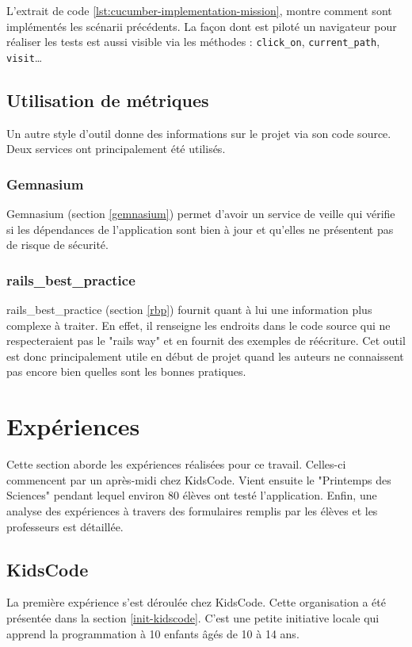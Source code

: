 L'extrait de code \ref{lst:cucumber-implementation-mission}, montre comment sont implémentés les scénarii précédents. La façon dont est piloté un navigateur pour réaliser les tests est aussi visible via les méthodes : \texttt{click\_on}, \texttt{current\_path}, \texttt{visit}\ldots

\subsection{Utilisation de métriques}
Un autre style d'outil donne des informations sur le projet via son code source. Deux services ont principalement été utilisés.

\subsubsection{Gemnasium}
Gemnasium (section \ref{gemnasium}) permet d'avoir un service de veille qui vérifie si les dépendances de l'application sont bien à jour et qu'elles ne présentent pas de risque de sécurité.

\subsubsection{rails\_best\_practice}
rails\_best\_practice (section \ref{rbp}) fournit quant à lui une information plus complexe à traiter. En effet, il renseigne les endroits dans le code source qui ne respecteraient pas le "rails way" et en fournit des exemples de réécriture. Cet outil est donc principalement utile en début de projet quand les auteurs ne connaissent pas encore bien quelles sont les bonnes pratiques.

\section{Expériences}
\label{experience}
Cette section aborde les expériences réalisées pour ce travail. Celles-ci commencent par un après-midi chez KidsCode. Vient ensuite le "Printemps des Sciences" pendant lequel environ 80 élèves ont testé l'application. Enfin, une analyse des expériences à travers des formulaires remplis par les élèves et les professeurs est détaillée.

\subsection{KidsCode}
\label{kidscode}
La première expérience s'est déroulée chez KidsCode. Cette organisation a été présentée dans la section \ref{init-kidscode}. C'est une petite initiative locale qui apprend la programmation à 10 enfants âgés de 10 à 14 ans.

